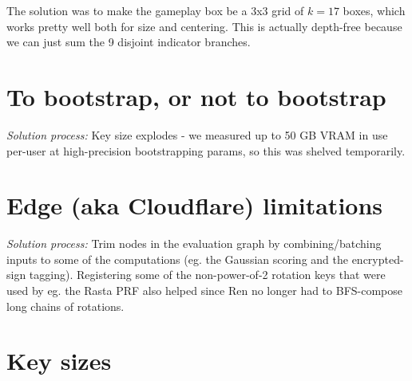 \documentclass{article}
\begin{document}
The solution was to make the gameplay box be a 3x3 grid of $k=17$ boxes, which works pretty well both for size and centering.
This is actually depth-free because we can just sum the 9 disjoint indicator branches.

\section{To bootstrap, or not to bootstrap}

\noindent{}
\vspace{0.3cm}

\textit{Solution process:} Key size explodes - we measured up to 50 GB VRAM in use per-user at high-precision bootstrapping params, so this was shelved temporarily. 

\section{Edge (aka Cloudflare) limitations}

\noindent{}
\vspace{0.3cm}

\textit{Solution process:} Trim nodes in the evaluation graph by combining/batching inputs to some of the computations (eg. the Gaussian scoring and the encrypted-sign tagging). 
Registering some of the non-power-of-2 rotation keys that were used by eg. the Rasta PRF also helped since Ren no longer had to BFS-compose long chains of rotations.

\section{Key sizes}
\end{document}
